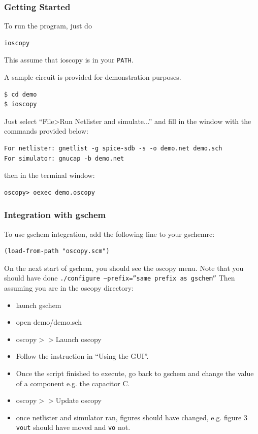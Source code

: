 \documentclass[a4paper,11pt]{article}
\begin{document}
\subsubsection{Getting Started}
To run the program, just do 
\begin{verbatim}
ioscopy
\end{verbatim}
This assume that ioscopy is in your \texttt{PATH}.

A sample circuit is provided for demonstration purposes. 
\begin{verbatim}
$ cd demo
$ ioscopy
\end{verbatim}
Just select ``File>Run Netlister and simulate...'' and fill in the window with the commands provided below: 
\begin{verbatim}
For netlister: gnetlist -g spice-sdb -s -o demo.net demo.sch
For simulator: gnucap -b demo.net
\end{verbatim}
then in the terminal window:
\begin{verbatim}
oscopy> oexec demo.oscopy
\end{verbatim}

\subsubsection{Integration with gschem}
\label{sec:gschemint}
To use gschem integration, add the following line to your gschemrc:
\begin{verbatim}
(load-from-path "oscopy.scm")
\end{verbatim}
On the next start of gschem, you should see the oscopy menu. Note that you should have done \texttt{./configure --prefix=''same prefix as gschem''} Then assuming you are in the oscopy directory: 
\begin{itemize}
\item     launch gschem
\item    open demo/demo.sch
\item    oscopy$> >$Launch oscopy
\item    Follow the instruction in ``Using the GUI''.
\item    Once the script finished to execute, go back to gschem and change the value of a component e.g. the capacitor C.
\item    oscopy$> >$Update oscopy
\item    once netlister and simulator ran, figures should have changed, e.g. figure 3 \texttt{vout} should have moved and \texttt{vo} not.
\end{itemize}
\end{document}
